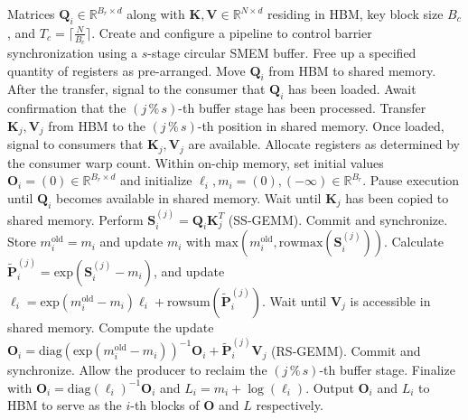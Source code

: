 \begin{algorithm}[H]
    \caption{\small\label{alg:flash3_wgmma_ws_only}\textsc{FlashAttention-3} forward pass \textbf{without} intra-consumer overlapping -- CTA view}
    \begin{algorithmic}[1]
\REQUIRE Matrices $\mathbf{Q}_i \in \mathbb{R}^{B_r \times d}$ along with $\mathbf{K}, \mathbf{V} \in \mathbb{R}^{N \times d}$ residing in HBM, key block size $B_c$, and $T_c = \lceil \frac{N}{B_c} \rceil$.
\STATE Create and configure a pipeline to control barrier synchronization using a $s$-stage circular SMEM buffer.
\STATE Free up a specified quantity of registers as pre-arranged.
\STATE Move $\mathbf{Q}_i$ from HBM to shared memory.
\STATE After the transfer, signal to the consumer that $\mathbf{Q}_i$ has been loaded.
    \STATE Await confirmation that the $(j\,\%\,s)$-th buffer stage has been processed.
    \STATE Transfer $\mathbf{K}_j, \mathbf{V}_j$ from HBM to the $(j\,\%\,s)$-th position in shared memory.
    \STATE Once loaded, signal to consumers that $\mathbf{K}_j, \mathbf{V}_j$ are available.
\ENDFOR
\ELSE 
\STATE Allocate registers as determined by the consumer warp count.
\STATE Within on-chip memory, set initial values $\mathbf{O}_i = (0) \in \mathbb{R}^{B_r \times d}$ and initialize $\ell_i, m_i = (0), (-\infty) \in \mathbb{R}^{B_r}$.
\STATE Pause execution until $\mathbf{Q}_i$ becomes available in shared memory.
\STATE Wait until $\mathbf{K}_j$ has been copied to shared memory.
\STATE Perform $\mathbf{S}_i^{(j)} = \mathbf{Q}_i \mathbf{K}_j^T$ (SS-GEMM). Commit and synchronize. \label{alg:ws_only_gemm1}
\STATE Store $m_i^{\mathrm{old}} = m_i$ and update $m_i$ with $\mathrm{max}(m_i^{\mathrm{old}}, \mathrm{rowmax}(\mathbf{S}_i^{(j)}))$. \label{code-ws:softmax_start}
\STATE Calculate $\widetilde{\mathbf{P}}_i^{(j)} = \mathrm{exp}(\mathbf{S}_i^{(j)} - m_i)$, and update $\ell_i = \mathrm{exp}(m_i^{\mathrm{old}} - m_i) \ell_i + \mathrm{rowsum}(\widetilde{\mathbf{P}}_i^{(j)})$. \label{code-ws:softmax_end}
\STATE Wait until $\mathbf{V}_j$ is accessible in shared memory.
\STATE Compute the update $\mathbf{O}_i = \mathrm{diag}(\mathrm{exp}(m_i^{\mathrm{old}} - m_i))^{-1} \mathbf{O}_i + \widetilde{\mathbf{P}}_i^{(j)} \mathbf{V}_j$ (RS-GEMM). Commit and synchronize. \label{alg:ws_only_gemm2}
\STATE Allow the producer to reclaim the $(j\,\%\,s)$-th buffer stage.
\ENDFOR
\STATE Finalize with $\mathbf{O}_i = \mathrm{diag}(\ell_i)^{-1} \mathbf{O}_i$ and $L_i = m_i + \log(\ell_i)$.
\STATE Output $\mathbf{O}_i$ and $L_i$ to HBM to serve as the $i$-th blocks of $\mathbf{O}$ and $L$ respectively.
\ENDIF
\end{algorithmic}
\end{algorithm}

